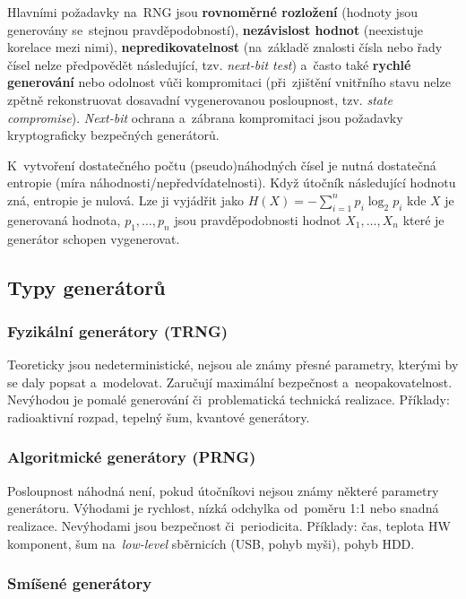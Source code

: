 Hlavními požadavky na~RNG jsou \textbf{rovnoměrné rozložení} (hodnoty jsou generovány se~stejnou pravděpodobností), \textbf{nezávislost hodnot} (neexistuje korelace mezi nimi), \textbf{nepredikovatelnost} (na~základě znalosti čísla nebo řady čísel nelze předpovědět následující, tzv. \emph{next-bit test}) a~často také \textbf{rychlé generování} nebo odolnost vůči kompromitaci (při~zjištění vnitřního stavu nelze zpětně rekonstruovat dosavadní vygenerovanou posloupnost, tzv. \emph{state compromise}). \emph{Next-bit} ochrana a~zábrana kompromitaci jsou požadavky kryptograficky bezpečných generátorů.

K~vytvoření dostatečného počtu (pseudo)náhodných čísel je nutná dostatečná entropie (míra náhodnosti/nepředvídatelnosti). Když útočník následující hodnotu zná, entropie je nulová. Lze ji vyjádřit jako $H(X) = - \sum_{i=1}^{n} p_i \log_2 p_i$ kde $X$ je generovaná hodnota, $p_1, \dots, p_n$ jsou pravděpodobnosti hodnot $X_1, \dots, X_n$ které je generátor schopen vygenerovat.

\subsection{Typy generátorů}

\subsubsection*{Fyzikální generátory (TRNG)}

Teoreticky jsou nedeterministické, nejsou ale známy přesné parametry, kterými by se daly popsat a~modelovat. Zaručují maximální bezpečnost a~neopakovatelnost. Nevýhodou je pomalé generování či~problematická technická realizace. Příklady: radioaktivní rozpad, tepelný šum, kvantové generátory.

\subsubsection*{Algoritmické generátory (PRNG)}

Posloupnost náhodná není, pokud útočníkovi nejsou známy některé parametry generátoru. Výhodami je rychlost, nízká odchylka od~poměru 1:1 nebo snadná realizace. Nevýhodami jsou bezpečnost či~periodicita. Příklady: čas, teplota HW komponent, šum na~\emph{low-level} sběrnicích (USB, pohyb myši), pohyb HDD.

\subsubsection*{Smíšené generátory}

